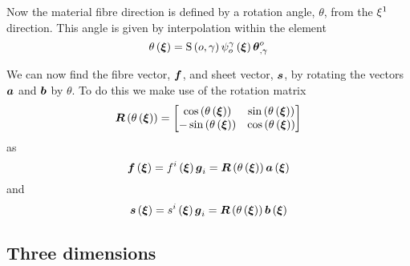 Now the material fibre direction is defined by a rotation angle,
$\theta$, from the $\xi^{1}$ direction. This angle is given by
interpolation within the element \ie
\begin{equation}
   \theta\left(  \boldsymbol{\xi}  \right) =   \mathrm{S} \left( o,\gamma \right)     \psi_{o}^{\gamma} \left(  \boldsymbol{\xi}  \right)    { \boldsymbol{\theta} }^{o} _{,\gamma} 
\end{equation}

We can now find the fibre vector, $ \boldsymbol{f} $, and sheet vector,
$ \boldsymbol{s} $, by rotating the vectors $ \boldsymbol{a} $ and $ \boldsymbol{b} $ by
$\theta$. To do this we make use of the rotation matrix
\begin{equation}
  \fnof{\matr{R}}{\fnof{\theta}{\vectr{\xi}}}=\begin{bmatrix}
  \cosine{\fnof{\theta}{\vectr{\xi}}} & \sine{\fnof{\theta}{\vectr{\xi}}} \\
  -\sine{\fnof{\theta}{\vectr{\xi}}} & \cosine{\fnof{\theta}{\vectr{\xi}}}
  \end{bmatrix}
\end{equation}
as
\begin{equation}
  \fnof{\vectr{f}}{\vectr{\xi}}=\fnof{f^{i}}{\vectr{\xi}}\generalbasevector_{i}=\fnof{\matr{R}}{\fnof{\theta}{\vectr{\xi}}}\fnof{\vectr{a}}{\vectr{\xi}}
\end{equation}
and
\begin{equation}
  \fnof{\vectr{s}}{\vectr{\xi}}=\fnof{s^{i}}{\vectr{\xi}}\generalbasevector_{i}=\fnof{\matr{R}}{\fnof{\theta}{\vectr{\xi}}}\fnof{\vectr{b}}{\vectr{\xi}}
\end{equation}
  
 
\subsection{Three dimensions}
\label{subsec:MaterialCoordinateTransformationsThreeD}
